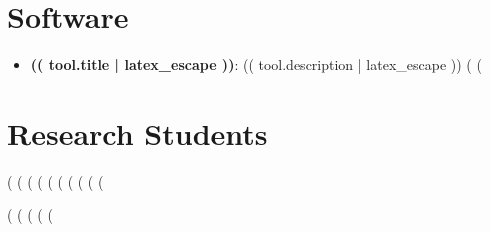 \documentclass[10pt]{article}
\begin{document}
\section{Software}

\begin{itemize}
(%
  \item \textbf{(( tool.title | latex_escape ))}: (( tool.description | latex_escape ))
  (%
(%
\end{itemize}

\section{Research Students}

(%
(%
  (%
    (%
    (%
    (%
    (%
    (%
  (%
(%

\begin{itemize}
(%
(%
(%
(%
(%
\end{itemize}
\end{document}
